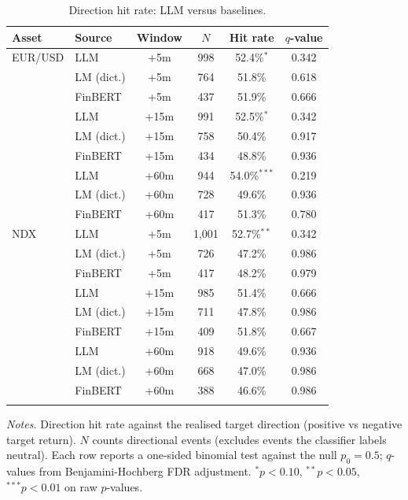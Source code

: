 \begin{table}[!htbp]
\centering
\caption{Direction hit rate: LLM versus baselines.}
\label{tab:baseline-compare}
\begin{threeparttable}
\small
\begin{tabular}{llcccc}
\toprule
\textbf{Asset} & \textbf{Source} & \textbf{Window} & \textbf{$N$} & \textbf{Hit rate} & \textbf{$q$-value} \\
\midrule
EUR/USD & LLM & +5m & 998 & 52.4\%$^{*}$ & 0.342 \\
 & LM (dict.) & +5m & 764 & 51.8\% & 0.618 \\
 & FinBERT & +5m & 437 & 51.9\% & 0.666 \\
\addlinespace[2pt]
 & LLM & +15m & 991 & 52.5\%$^{*}$ & 0.342 \\
 & LM (dict.) & +15m & 758 & 50.4\% & 0.917 \\
 & FinBERT & +15m & 434 & 48.8\% & 0.936 \\
\addlinespace[2pt]
 & LLM & +60m & 944 & 54.0\%$^{***}$ & 0.219 \\
 & LM (dict.) & +60m & 728 & 49.6\% & 0.936 \\
 & FinBERT & +60m & 417 & 51.3\% & 0.780 \\
\addlinespace[2pt]
\midrule
NDX & LLM & +5m & 1,001 & 52.7\%$^{**}$ & 0.342 \\
 & LM (dict.) & +5m & 726 & 47.2\% & 0.986 \\
 & FinBERT & +5m & 417 & 48.2\% & 0.979 \\
\addlinespace[2pt]
 & LLM & +15m & 985 & 51.4\% & 0.666 \\
 & LM (dict.) & +15m & 711 & 47.8\% & 0.986 \\
 & FinBERT & +15m & 409 & 51.8\% & 0.667 \\
\addlinespace[2pt]
 & LLM & +60m & 918 & 49.6\% & 0.936 \\
 & LM (dict.) & +60m & 668 & 47.0\% & 0.986 \\
 & FinBERT & +60m & 388 & 46.6\% & 0.986 \\
\addlinespace[2pt]
\midrule
\bottomrule
\end{tabular}
\begin{tablenotes}
\footnotesize
\item \textit{Notes.} Direction hit rate against the realised target
direction (positive vs negative target return). $N$ counts directional
events (excludes events the classifier labels neutral). Each row
reports a one-sided binomial test against the null $p_0 = 0.5$;
$q$-values from Benjamini-Hochberg FDR adjustment.
$^{*}p<0.10$, $^{**}p<0.05$, $^{***}p<0.01$ on raw $p$-values.
\end{tablenotes}
\end{threeparttable}
\end{table}
